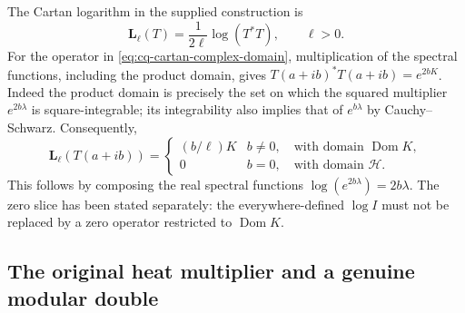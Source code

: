 The Cartan logarithm in the supplied construction is
\[
 \mathbf L_\ell(T)=\frac{1}{2\ell}\log(T^*T),\qquad \ell>0.
\]
For the operator in \eqref{eq:cq-cartan-complex-domain}, multiplication
of the spectral functions, including the product domain, gives
$T(a+ib)^*T(a+ib)=e^{2bK}$. Indeed the product domain is precisely
the set on which the squared multiplier $e^{2b\lambda}$ is
square-integrable; its integrability also implies that of
$e^{b\lambda}$ by Cauchy--Schwarz. Consequently,
\begin{equation}
 \mathbf L_\ell(T(a+ib))=
 \begin{cases}
 (b/\ell)K & b\ne0,\quad\text{with domain }\operatorname{Dom}K,\\
 0 & b=0,\quad\text{with domain }\mathscr H.
 \end{cases}
 \label{eq:cq-cartan-log-domain}
\end{equation}
This follows by composing the real spectral functions
$\log(e^{2b\lambda})=2b\lambda$. The zero slice has been stated
separately: the everywhere-defined $\log I$ must not be replaced
by a zero operator restricted to $\operatorname{Dom}K$.

\subsection{The original heat multiplier and a genuine modular double}


